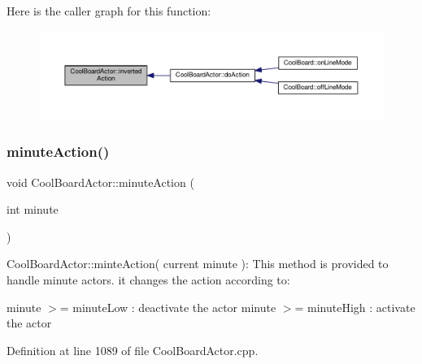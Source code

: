 Here is the caller graph for this function\+:\nopagebreak
\begin{figure}[H]
\begin{center}
\leavevmode
\includegraphics[width=350pt]{dc/d69/class_cool_board_actor_aae82b2e62f91be009d40f93c206f9bda_icgraph}
\end{center}
\end{figure}
\mbox{\label{class_cool_board_actor_af000944ce0b9abb9c6ee4b8fe839fb36}} 
\subsubsection{\texorpdfstring{minute\+Action()}{minuteAction()}}
{\footnotesize\ttfamily void Cool\+Board\+Actor\+::minute\+Action (\begin{DoxyParamCaption}\item[{int}]{minute }\end{DoxyParamCaption})}

Cool\+Board\+Actor\+::minte\+Action( current minute )\+: This method is provided to handle minute actors. it changes the action according to\+:

minute $>$= minute\+Low \+: deactivate the actor minute $>$= minute\+High \+: activate the actor 

Definition at line 1089 of file Cool\+Board\+Actor.\+cpp.


